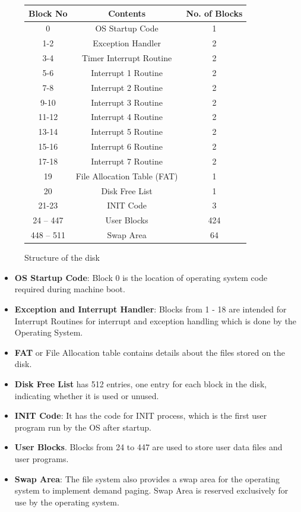 \documentclass[11pt]{article}
\begin{document}
\begin{figure}[htp!] \small
	\centering
	\begin{tabular}{|c|c|c|}
	\toprule
		\textbf{Block No} & \textbf{Contents} & \textbf{No. of Blocks}\\ \hline
	\toprule
		0 & OS Startup Code & 1\\ \hline
		1-2 & Exception Handler & 2\\ \hline
		3-4 & Timer Interrupt Routine & 2\\ \hline
		5-6 & Interrupt 1 Routine  & 2\\ \hline 
		7-8 & Interrupt 2 Routine  & 2\\ \hline 
		9-10 & Interrupt 3 Routine  & 2\\ \hline 
		11-12 & Interrupt 4 Routine  & 2\\ \hline 
		13-14 & Interrupt 5 Routine  & 2\\ \hline 
		15-16 & Interrupt 6 Routine  & 2\\ \hline 
		17-18 & Interrupt 7 Routine  & 2\\ \hline 
		19 & File Allocation Table (FAT)  & 1\\ \hline
		20 & Disk Free List  & 1\\ \hline
		21-23 & INIT Code  & 3 \\ \hline
		24 -- 447 & User Blocks  & 424\\ \hline
		448 -- 511 & Swap Area  & 64\\ \hline					
	\end{tabular}
	\caption{Structure of the disk}
	\label{fig:disk}
\end{figure}

\begin{itemize}
\item \textbf{OS Startup Code}: Block 0 is the location of operating system code required during machine boot. 
\item \textbf{Exception and Interrupt Handler}: Blocks from 1 - 18 are intended for Interrupt Routines for interrupt and exception handling which is done by the Operating System.  
\item \textbf{FAT} or File Allocation table contains details about the files stored on the disk. 
\item \textbf{Disk Free List} has 512 entries, one entry for each block in the disk, indicating whether it is used or unused. 
\item \textbf{INIT Code}: It has the code for INIT process, which is the first user program run by the OS after startup. 
\item \textbf{User Blocks}. Blocks from 24 to 447 are used to store user data files and user programs.
\item \textbf{Swap Area}: The file system also provides a swap area for the operating system to implement demand paging. Swap Area is reserved exclusively for use by the operating system.
\end{itemize}
\end{document}

